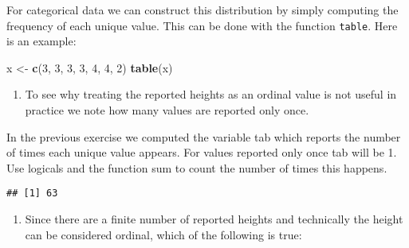 \documentclass[]{article}
\newenvironment{Shaded}{\begin{snugshade}}{\end{snugshade}}
\newcommand{\DecValTok}[1]{\textcolor[rgb]{0.00,0.00,0.81}{#1}}
\newcommand{\KeywordTok}[1]{\textcolor[rgb]{0.13,0.29,0.53}{\textbf{#1}}}
\newcommand{\NormalTok}[1]{#1}
\newcommand{\OperatorTok}[1]{\textcolor[rgb]{0.81,0.36,0.00}{\textbf{#1}}}
\newcommand{\StringTok}[1]{\textcolor[rgb]{0.31,0.60,0.02}{#1}}
\providecommand{\tightlist}{%
  \setlength{\itemsep}{0pt}\setlength{\parskip}{0pt}}
\begin{document}
For categorical data we can construct this distribution by simply
computing the frequency of each unique value. This can be done with the
function \texttt{table}. Here is an example:

\begin{Shaded}
\begin{Highlighting}[]
\NormalTok{x <-}\StringTok{ }\KeywordTok{c}\NormalTok{(}\DecValTok{3}\NormalTok{, }\DecValTok{3}\NormalTok{, }\DecValTok{3}\NormalTok{, }\DecValTok{3}\NormalTok{, }\DecValTok{4}\NormalTok{, }\DecValTok{4}\NormalTok{, }\DecValTok{2}\NormalTok{)}
\KeywordTok{table}\NormalTok{(x)}
\end{Highlighting}
\end{Shaded}

\begin{Shaded}
\end{Shaded}

\begin{enumerate}
\def\labelenumi{\arabic{enumi}.}
\setcounter{enumi}{4}
\tightlist
\item
  To see why treating the reported heights as an ordinal value is not
  useful in practice we note how many values are reported only once.
\end{enumerate}

In the previous exercise we computed the variable tab which reports the
number of times each unique value appears. For values reported only once
tab will be 1. Use logicals and the function sum to count the number of
times this happens.

\begin{Shaded}
\end{Shaded}

\begin{verbatim}
## [1] 63
\end{verbatim}

\begin{enumerate}
\def\labelenumi{\arabic{enumi}.}
\setcounter{enumi}{5}
\tightlist
\item
  Since there are a finite number of reported heights and technically
  the height can be considered ordinal, which of the following is true:
\end{enumerate}
\end{document}
